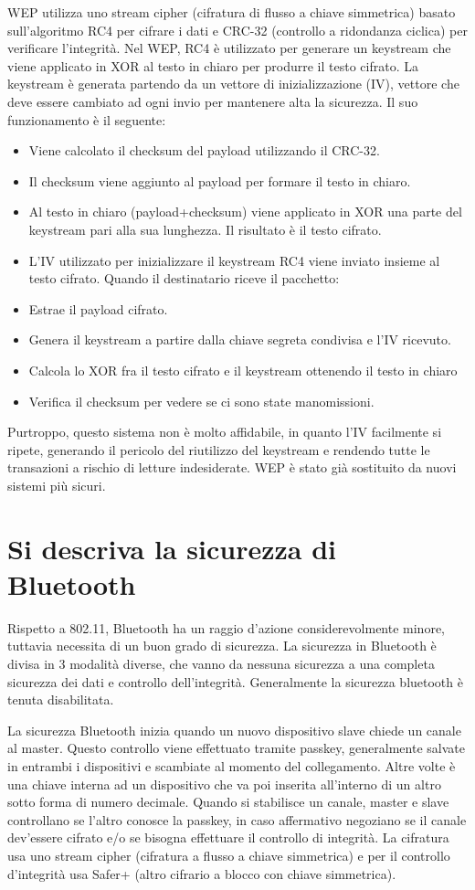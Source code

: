 WEP utilizza uno stream cipher (cifratura di flusso a chiave simmetrica) basato sull’algoritmo RC4 per cifrare i dati e CRC-32 (controllo a ridondanza ciclica) per verificare l’integrità.
Nel WEP, RC4 è utilizzato per generare un keystream che viene applicato in XOR al testo in chiaro per produrre il testo cifrato. La keystream è generata partendo da un vettore di inizializzazione (IV), vettore che deve essere cambiato ad ogni invio per mantenere alta la sicurezza.
Il suo funzionamento è il seguente:
\begin{itemize}
\item	Viene calcolato il checksum del payload utilizzando il CRC-32.
\item	Il checksum viene aggiunto al payload per formare il testo in chiaro.
\item	Al testo in chiaro (payload+checksum) viene applicato in XOR una parte del keystream pari alla sua lunghezza. Il risultato è il testo cifrato.
\item	L’IV utilizzato per inizializzare il keystream RC4 viene inviato insieme al testo cifrato.
Quando il destinatario riceve il pacchetto:
\item	Estrae il payload cifrato.
\item	Genera il keystream a partire dalla chiave segreta condivisa e l’IV ricevuto.
\item	Calcola lo XOR fra il testo cifrato e il keystream ottenendo il testo in chiaro
\item	Verifica il checksum per vedere se ci sono state manomissioni.
\end{itemize}
Purtroppo, questo sistema non è molto affidabile, in quanto l’IV facilmente si ripete, generando il pericolo del riutilizzo del keystream e rendendo tutte le transazioni a rischio di letture indesiderate. WEP è stato già sostituito da nuovi sistemi più sicuri.

\section{Si descriva la sicurezza di Bluetooth}

Rispetto a 802.11, Bluetooth ha un raggio d’azione considerevolmente minore, tuttavia necessita di un buon grado di sicurezza.
La sicurezza in Bluetooth è divisa in 3 modalità diverse, che vanno da nessuna sicurezza a una completa sicurezza dei dati e controllo dell’integrità.
Generalmente la sicurezza bluetooth è tenuta disabilitata.

La sicurezza Bluetooth inizia quando un nuovo dispositivo slave chiede un canale al master.
Questo controllo viene effettuato tramite passkey, generalmente salvate in entrambi i dispositivi e scambiate al momento del collegamento. Altre volte è una chiave interna ad un dispositivo che va poi inserita all’interno di un altro sotto forma di numero decimale.
Quando si stabilisce un canale, master e slave controllano se l’altro conosce la passkey, in caso affermativo negoziano se il canale dev’essere cifrato e/o se bisogna effettuare il controllo di integrità.
La cifratura usa uno stream cipher (cifratura a flusso a chiave simmetrica) e per il controllo d’integrità usa Safer+ (altro cifrario a blocco con chiave simmetrica).

